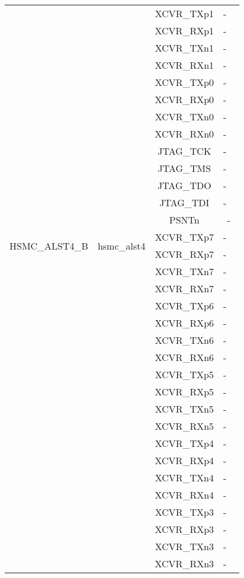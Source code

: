 \begin{longtable}[l]{|c|c|c|c|}
  & & XCVR\_TXp1 & - \
  \\\cline{3-4}
  & & XCVR\_RXp1 & - \
  \\\cline{3-4}
  & & XCVR\_TXn1 & - \
  \\\cline{3-4}
  & & XCVR\_RXn1 & - \
  \\\cline{3-4}
  & & XCVR\_TXp0 & - \
  \\\cline{3-4}
  & & XCVR\_RXp0 & - \
  \\\cline{3-4}
  & & XCVR\_TXn0 & - \
  \\\cline{3-4}
  & & XCVR\_RXn0 & - \
  \\\cline{3-4}
  & & JTAG\_TCK & - \
  \\\cline{3-4}
  & & JTAG\_TMS & - \
  \\\cline{3-4}
  & & JTAG\_TDO & - \
  \\\cline{3-4}
  & & JTAG\_TDI & - \
  \\\cline{3-4}
  & & PSNTn & - \\
	\hline
	\multirow{2}{*}{HSMC\_ALST4\_B} & \multirow{2}{*}{hsmc\_alst4} & XCVR\_TXp7 & - \
  \\\cline{3-4}
  & & XCVR\_RXp7 & - \
  \\\cline{3-4}
  & & XCVR\_TXn7 & - \
  \\\cline{3-4}
  & & XCVR\_RXn7 & - \
  \\\cline{3-4}
  & & XCVR\_TXp6 & - \
  \\\cline{3-4}
  & & XCVR\_RXp6 & - \
  \\\cline{3-4}
  & & XCVR\_TXn6 & - \
  \\\cline{3-4}
  & & XCVR\_RXn6 & - \
  \\\cline{3-4}
  & & XCVR\_TXp5 & - \
  \\\cline{3-4}
  & & XCVR\_RXp5 & - \
  \\\cline{3-4}
  & & XCVR\_TXn5 & - \
  \\\cline{3-4}
  & & XCVR\_RXn5 & - \
  \\\cline{3-4}
  & & XCVR\_TXp4 & - \
  \\\cline{3-4}
  & & XCVR\_RXp4 & - \
  \\\cline{3-4}
  & & XCVR\_TXn4 & - \
  \\\cline{3-4}
  & & XCVR\_RXn4 & - \
  \\\cline{3-4}
  & & XCVR\_TXp3 & - \
  \\\cline{3-4}
  & & XCVR\_RXp3 & - \
  \\\cline{3-4}
  & & XCVR\_TXn3 & - \
  \\\cline{3-4}
  & & XCVR\_RXn3 & - \
  \\\cline{3-4}

\end{longtable}
